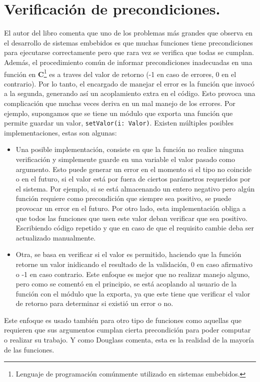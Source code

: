 \section{Verificación de precondiciones.}
El autor del libro \cite{douglass} comenta que uno de los problemas más grandes que observa en el desarrollo de sistemas embebidos es que muchas funciones tiene precondiciones para ejecutarse correctamente pero que rara vez se verifica que todas se cumplan. Además, el procedimiento común de informar precondiciones inadecuadas en una función en \textbf{C}\footnote{Lenguaje de programación comúnmente utilizado en sistemas embebidos.} es a traves del valor de retorno (-1 en caso de errores, 0 en el contrario). Por lo tanto, el encargado de manejar el error es la función que invocó a la segunda, generando así un acoplamiento extra en el código. Esto provoca una complicación que muchas veces deriva en un mal manejo de los errores. Por ejemplo, supongamos que se tiene un módulo que exporta una función que permite guardar un valor, \verb|setValor(i: Valor)|. Existen múltiples posibles implementaciones, estas son algunas:
\begin{itemize}
    \item Una posible implementación, consiste en que la función no realice ninguna verificación y simplemente guarde en una variable el valor pasado como argumento. Esto puede generar un error en el momento si el tipo no coincide o en el futuro, si el valor está por fuera de ciertos parámetros requeridos por el sistema. Por ejemplo, si se está almacenando un entero negativo pero algún función requiere como precondición que siempre sea positivo, se puede provocar un error en el futuro. Por otro lado, esta implementación obliga a que todos las funciones que usen este valor deban verificar que sea positivo. Escribiendo código repetido y que en caso de que el requisito cambie deba ser actualizado manualmente.
    \item Otra, se basa en verificar si el valor es permitido, haciendo que la función retorne un valor inidicando el resultado de la validación, 0 en caso afirmativo o -1 en caso contrario. Este enfoque es mejor que no realizar manejo alguno, pero como se comentó en el principio, se está acoplando al usuario de la función con el módulo que la exporta, ya que este tiene que verificar el valor de retorno para determinar si existió un error o no.
\end{itemize}

Este enfoque es usado también para otro tipo de funciones como aquellas que requieren que sus argumentos cumplan cierta precondición para poder computar o realizar su trabajo. Y como Douglass comenta, esta es la realidad de la mayoría de las funciones.

